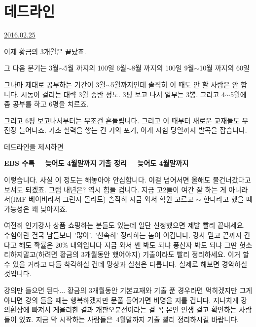 \section{데드라인}
\href{https://www.kockoc.com/Apoc/650700}{2016.02.25}

\vspace{5mm}

이제 황금의 3개월은 끝났죠.
\vspace{5mm}

그 다음 분기는
3월$\sim$5월 까지의 100일
6월$\sim$8월 까지의 100일
9월$\sim$10월 까지의 60일
\vspace{5mm}

그나마 제대로 공부하는 기간이 3월$\sim$5월까지인데 솔직히 이 때도 안 할 사람은 안 합니다.
시동이 걸리는 대략 3월 중반 정도. 3평 보고 나서 일부는 3뽕.
그리고 4$\sim$5월에 좀 공부를 하고 6평을 치르죠.
\vspace{5mm}

그리고 6평 보고나서부터는 무조건 흔들립니다. 그리고 이 때부터 새로운 교재들도 무진장 늘어나죠.
기초 실력을 쌓는 건 거의 포기, 이게 시험 당일까지 발목을 잡습니다.
\vspace{5mm}

데드라인을 제시하면
\vspace{5mm}

\textbf{EBS 수특 $-$ 늦어도 4월말까지}
\textbf{기출 정리 $-$ 늦어도 4월말까지}
\vspace{5mm}

이렇습니다. 사실 이 정도는 해놓아야 안심합니다. 이걸 넘어서면 올해도 물건너갔다고 보셔도 되겠죠.
그럼 내년은? 역시 힘들 겁니다. 지금 고2들이 여간 잘 하는 게 아니라서(IMF 베이비라서 그런지 몰라도)
솔직히 지금 와서 학원 고르고 $\sim$ 한다라고 했을 때 가능성은 꽤 낮아지죠.
\vspace{5mm}

여전히 인기강사 상품 쇼핑하는 분들도 있는데 일단 신청했으면 제발 빨리 끝내세요.
수험이란 결국 남들보다 '많이', '신속히' 정리하는 놈이 이깁니다. 강사 믿고 끝까지 간다고 해도 확률은 20$\%$ 내외입니다
지금 와서 쎈 봐도 되냐 풍산자 봐도 되냐 그딴 헛소리하지말고(하려면 황금의 3개월동안 했어야지)
기출이라도 빨리 정리하세요. 이거 할 수 있을 거라고 다들 착각하실 건데 망상과 실천은 다릅니다. 실제로 해보면 경악하실 것입니다.
\vspace{5mm}

강의만 들으면 된다... 황금의 3개월동안 기본교재와 기출 푼 경우라면 먹히겠지만 그게 아니면 강의 들을 때는 행복하겠지만
문풀 들어가면 비명을 지를 겁니다. 지나치게 강의환상에 빠져서 게을리한 결과 개판오분전이라는 걸 꼭 본인 인생 걸고 확인하는 사람들이 있죠.
지금 막 시작하는 사람들은 4월말까지 기출 빨리 정리하시길 바랍니다.
\vspace{5mm}

